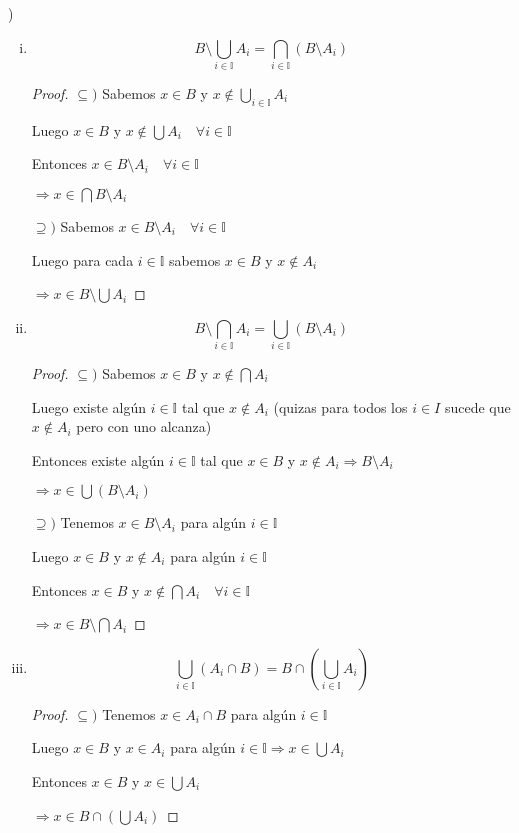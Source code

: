 \documentclass[12pt]{article}
\newcommand{\I}{\mathbb{I}}
\newcommand{\Ra}{\Rightarrow}
\theoremstyle{definition}
\begin{document}
)
\begin{enumerate}[i.]
  \item $$B \setminus \bigcup_{i \in \I} A_{i} = \bigcap_{i \in \I} (B \setminus A_{i})$$
    \begin{proof}
    $\subseteq )$ Sabemos $x \in B $ y $x \notin \bigcup_{i \in \I} A_{i}$ 

    Luego $x \in B$ y $x \notin \bigcup A_{i} \quad \forall i \in \I $

    Entonces $x \in B \setminus A_{i} \quad \forall i \in \I$

    $\Ra x \in \bigcap B \setminus A_{i}$
    
$\supseteq )$ Sabemos $x \in B \setminus A_{i} \quad \forall i \in \I$

Luego para cada $i \in \I$ sabemos $x \in B$ y $x \notin A_{i}$

$\Ra x \in B \setminus \bigcup A_{i}$


  \end{proof}
\item $$B \setminus \bigcap_{i \in \I} A_{i} = \bigcup_{i \in \I} (B \setminus A_{i})$$

  \begin{proof}
  $\subseteq )$ Sabemos $x \in B $ y $x \notin \bigcap A_{i}$ 

    Luego existe algún $i \in \I$ tal que $x \notin A_{i}$ (quizas para todos los $i \in I$ sucede que $x \notin A_{i}$ pero con uno alcanza)

    Entonces existe algún $i \in \I$ tal que $x \in B$ y $x \notin A_{i} \Ra B \setminus A_{i} $

  $\Ra x \in \bigcup (B \setminus A_{i})$

$\supseteq )$ Tenemos $x \in B \setminus A_{i}$ para algún $i \in \I$

Luego $x \in B$ y $x \notin A_{i}$ para algún $i \in \I$

Entonces $x \in B$ y $x \notin \bigcap A_{i} \quad \forall i \in \I$

$\Ra x \in B \setminus \bigcap A_{i}$


   \end{proof}
\item $$\bigcup_{i \in \I} (A_{i} \cap B) = B \cap (\bigcup_{i \in \I} A_{i})$$

  \begin{proof}
  $\subseteq )$ Tenemos $x \in A_{i} \cap B$ para algún $i \in \I$  
  
  Luego $x \in B$ y $x \in A_{i}$ para algún $i \in \I \Ra x \in \bigcup A_{i}$

  Entonces $x \in B$ y $x \in \bigcup A_{i}$

  $\Ra x \in B \cap (\bigcup A_{i})$
\end{proof}
 
\end{enumerate}
\end{document}
